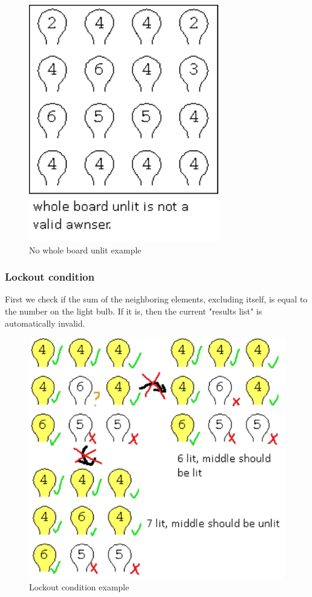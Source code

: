 \documentclass[runningheads]{llncs}
\begin{document}
\begin{figure}
	\includegraphics[scale=0.5]{lightbulb_no_whole_board_unlit_restriction}
	\centering
	\caption{No whole board unlit example}
	\centering
	\end{figure}
\clearpage
\subsubsection*{Lockout condition} \hfill \break
First we check if the sum of the neighboring elements, excluding itself, is equal to the number on the light bulb. If it is, then the current "results list" is automatically invalid.
\begin{figure}
	\includegraphics[scale=0.5]{lightbulb_impossible_state}
	\centering
	\caption{Lockout condition example}
	\centering
\end{figure}
\end{document}
